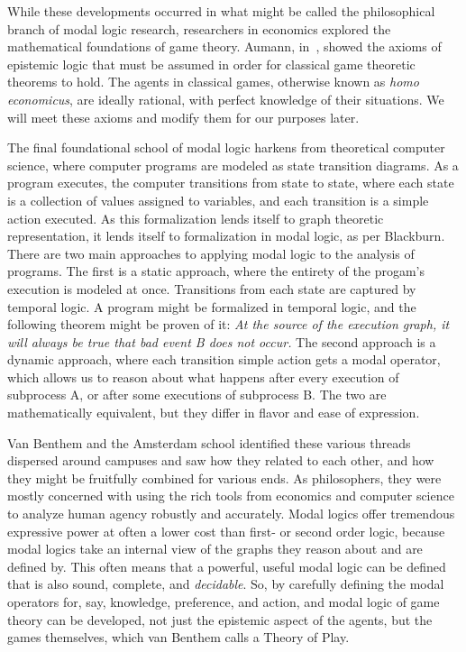 While these developments occurred in what might be called the philosophical branch of modal logic research, researchers in economics explored the mathematical foundations of game theory. Aumann, in~\cite{Aumann}, showed the axioms of epistemic logic that must be assumed in order for classical game theoretic theorems to hold. The agents in classical games, otherwise known as \emph{homo economicus}, are ideally rational, with perfect knowledge of their situations. We will meet these axioms and modify them for our purposes later.

The final foundational school of modal logic harkens from theoretical computer science, where computer programs are modeled as state transition diagrams. As a program executes, the computer transitions from state to state, where each state is a collection of values assigned to variables, and each transition is a simple action executed. As this formalization lends itself to graph theoretic representation, it lends itself to formalization in modal logic, as per Blackburn. There are two main approaches to applying modal logic to the analysis of programs. The first is a static approach, where the entirety of the progam's execution is modeled at once. Transitions from each state are captured by temporal logic. A program might be formalized in temporal logic, and the following theorem might be proven of it: \emph{At the source of the execution graph, it will always be true that bad event B does not occur.} The second approach is a dynamic approach, where each transition simple action gets a modal operator, which allows us to reason about what happens after every execution of subprocess A, or after some executions of subprocess B. The two are mathematically equivalent, but they differ in flavor and ease of expression. 

Van Benthem and the Amsterdam school identified these various threads dispersed around campuses and saw how they related to each other, and how they might be fruitfully combined for various ends. As philosophers, they were mostly concerned with using the rich tools from economics and computer science to analyze human agency robustly and accurately. Modal logics offer tremendous expressive power at often a lower cost than first- or second order logic, because modal logics take an internal view of the graphs they reason about and are defined by. This often means that a powerful, useful modal logic can be defined that is also sound, complete, and \emph{decidable}. So, by carefully defining the modal operators for, say, knowledge, preference, and action, and modal logic of game theory can be developed, not just the epistemic aspect of the agents, but the games themselves, which van Benthem calls a Theory of Play. 

